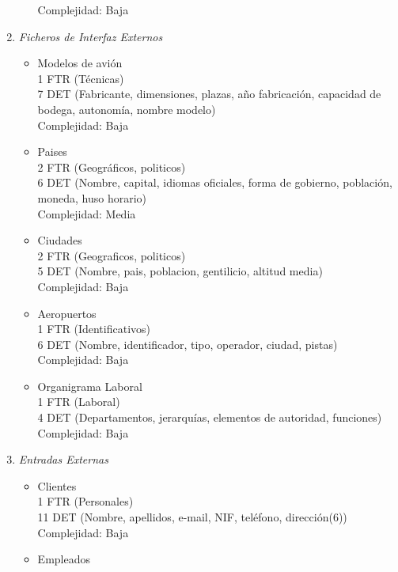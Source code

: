 \begin{enumerate}
\begin{itemize}
			Complejidad: Baja\\
	\end{itemize}
	\item \textit{Ficheros de Interfaz Externos}
	\begin{itemize}
		\item Modelos de avión \\
			1 FTR (Técnicas) \\
			7 DET (Fabricante, dimensiones, plazas, año fabricación, capacidad de bodega, autonomía, nombre modelo) \\
			Complejidad: Baja\\
		\item Paises \\
			2 FTR (Geográficos, politicos) \\
			6 DET (Nombre, capital, idiomas oficiales, forma de gobierno, población, moneda, huso horario) \\
			Complejidad: Media\\	
		\item Ciudades \\
			2 FTR (Geograficos, politicos) \\
			5 DET (Nombre, pais, poblacion, gentilicio, altitud media) \\
			Complejidad: Baja\\
		\item Aeropuertos \\
			1 FTR (Identificativos) \\
			6 DET (Nombre, identificador, tipo, operador, ciudad, pistas) \\
			Complejidad: Baja\\
		\item Organigrama Laboral \\
			1 FTR (Laboral) \\
			4 DET (Departamentos, jerarquías, elementos de autoridad, funciones) \\
			Complejidad: Baja\\
	\end{itemize}
	\item \textit{Entradas Externas}
	\begin{itemize}
		\item Clientes \\
			1 FTR (Personales) \\
			11 DET (Nombre, apellidos, e-mail, NIF, teléfono, dirección(6)) \\
			Complejidad: Baja\\
		\item Empleados \\

\end{itemize}
\end{enumerate}
